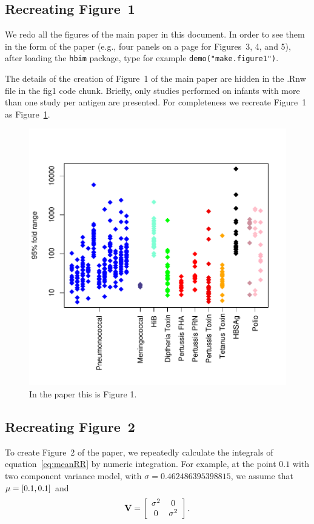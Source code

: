 \documentclass{article}[12pt]
\begin{document}
\subsection{Recreating Figure~1}

We redo all the figures of the main paper in this document. In order to see them in the form of the paper 
(e.g., four panels on a page for Figures~3, 4, and 5), after loading the \texttt{hbim} package, type 
for example \texttt{demo("make.figure1")}.


The details of the creation of Figure~1 of the main paper are hidden in the .Rnw file in the fig1 code chunk. 
Briefly, only studies performed on infants with more than one study per antigen are presented.
For completeness we recreate Figure~1 as Figure~\ref{fig:fig1}.


\begin{figure}
\caption{In the paper this is Figure 1.
 \label{fig:fig1} }
\includegraphics{hbimdetails-fig1}
\end{figure}


\subsection{Recreating Figure~2}
\label{app:fig2}


To create Figure~2 of the paper, we repeatedly calculate the integrals of equation~\ref{eq:meanRR} by numeric integration. 
For example, at the point $0.1$ with two component variance model, with $\sigma=0.462486395398815$, 
we assume that ${\bf \mu} = [0.1, 0.1]$ and 
\[
{\bf V} =\left[ \begin{array}{cc}
\sigma^2 & 0 \\
0 & \sigma^2 \\ 
\end{array}
\right].
\]
\end{document}
